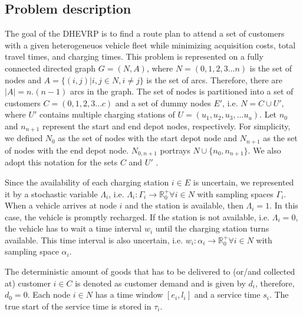 \documentclass[11pt]{article}
\begin{document}
\subsection{Problem description}
The goal of the DHEVRP is to find a route plan to attend a set of customers with a given heterogeneuos vehicle fleet while minimizing acquisition costs, total travel times, and charging times. This problem is represented on a fully connected directed graph $G = (N, A)$, where $N = (0,1, 2, 3 \dots n)$ is the set of nodes and $A = \{(i, j) |  i, j \in N, i \neq j \}$ is the set of arcs. Therefore, there are $|A| = n.(n-1)$ arcs in the graph. The set of nodes is partitioned into a set of customers $C = (0,1, 2, 3 \dots c)$ and a set of dummy nodes $E'$, i.e. $N = C \cup U'$, where $U'$ contains multiple charging stations of $U = (u_1, u_2, u_3, \dots u_u)$. Let $n_0$ and $n_{n+1}$ represent the start and end depot nodes, respectively. For simplicity, we defined $N_0$ as the set of nodes with the start depot node and $N_{n+1}$ as the set of nodes with the end depot node. $N_{0, n+1}$ portrays $N \cup \{n_0, n_{n+1}\}$. We also adopt this notation for the sets $C$ and $U'$ \citep{Hiermann2016}.

Since the availability of each charging station $i \in E$ is uncertain, we represented it by a stochastic variable $\Lambda_i$, i.e. $\Lambda_i:\Gamma_{i} \to \mathbb{R}_0^+ \forall i \in N$ with sampling spaces $\Gamma_{i}$. When a vehicle arrives at node $i$ and the station is available, then $\Lambda_i = 1$. In this case, the vehicle is promptly recharged. If the station is not available, i.e. $\Lambda_i = 0$, the vehicle has to wait a time interval $w_i$ until the charging station turns available. This time interval is also uncertain, i.e. $w_i:\alpha_{i} \to \mathbb{R}_0^+ \forall i \in N$ with sampling space $\alpha_{i}$. 

The deterministic amount of goods that has to be delivered to (or/and collected at) customer $i \in C$ is denoted as customer demand and is given by $d_i$, therefore, $d_0 = 0$. Each node $i \in N$ has a time window $[e_i, l_i]$ and a service time $s_i$. The true start of the service time is stored in $\tau_i$.
\end{document}
